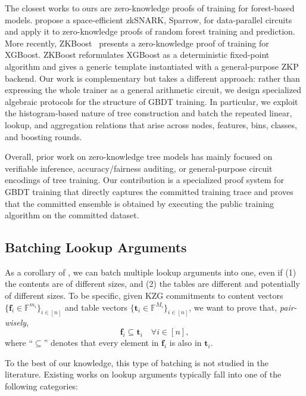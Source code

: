The closest works to ours are zero-knowledge proofs of training for forest-based
models. \citet{sparrow24} propose a space-efficient zkSNARK, Sparrow, for
data-parallel circuits and apply it to
zero-knowledge proofs of random forest training
and prediction.
More
recently, ZKBoost~\cite{zkboost26} presents a zero-knowledge proof of training for
XGBoost. ZKBoost reformulates XGBoost as a deterministic fixed-point algorithm
and gives a generic template instantiated with a general-purpose ZKP
backend. 
Our work is complementary but takes a different approach: rather than
expressing the whole trainer as a general arithmetic circuit, we design
specialized algebraic protocols for the structure of GBDT training. In
particular, we exploit the histogram-based nature of tree construction and batch
the repeated linear, lookup, and aggregation relations that arise across nodes,
features, bins, classes, and boosting rounds.

Overall, prior work on zero-knowledge tree models has mainly focused on
verifiable inference, accuracy/fairness auditing, or general-purpose circuit
encodings of tree training. Our contribution is a specialized proof system for
GBDT training that directly captures the committed training trace and proves
that the committed ensemble is obtained by executing the public
training algorithm on the committed dataset.

\subsection{Batching Lookup Arguments}\label{subsec:related-lookup-batching}
As a corollary of ,
    we can batch multiple lookup arguments into one,
    even if (1) the contents are of different sizes,
    and (2) the tables are different and potentially of different sizes.
    To be specific,
    given KZG commitments to content vectors $\{\mathbf{f}_i\in \mathbb{F}^{m_i}\}_{i\in [n]}$
    and table vectors $\{\mathbf{t}_i\in \mathbb{F}^{M_i}\}_{i\in [n]}$,
    we want to prove that, \emph{pair-wisely},
    \[
        \mathbf{f}_i \subseteq \mathbf{t}_i\quad \forall i\in [n],
    \]
    where ``$\subseteq$'' denotes that every element in $\mathbf{f}_i$ is also in $\mathbf{t}_i$.

To the best of our knowledge, this type of batching
    is not studied in the literature.
    Existing works on lookup arguments typically fall into one of the following categories:

